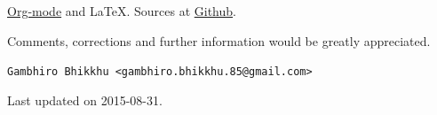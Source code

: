 \documentclass[11pt,oneside]{memoir-article}
\begin{document}
\href{http://orgmode.org/}{Org-mode} and \LaTeX. Sources at \href{https://github.com/profound-labs/calculating-the-uposatha-moondays/}{Github}.

Comments, corrections and further information would be greatly
appreciated.

\texttt{Gambhiro Bhikkhu <gambhiro.bhikkhu.85@gmail.com>}

Last updated on 2015-08-31.





\end{document}
